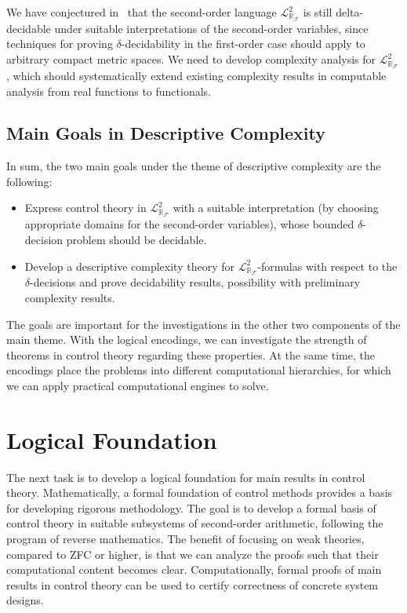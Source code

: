 \documentclass[10pt]{article}
\newcommand{\lrf}{\mathcal{L}_{\mathbb{R}_{\mathcal{F}}}}
\theoremstyle{definition}
\begin{document}
We have conjectured in~\cite{DBLP:conf/lics/GaoAC12} that the second-order language $\lrf^2$ is still delta-decidable under suitable interpretations of the second-order variables, since techniques for proving $\delta$-decidability in the first-order case should apply to arbitrary compact metric spaces. We need to develop complexity analysis for $\lrf^2$, which should systematically extend existing complexity results in computable analysis from real functions to functionals. 

\subsection{Main Goals in Descriptive Complexity} 
In sum, the two main goals under the theme of descriptive complexity are the following:
\begin{itemize}
\item Express control theory in $\mathcal{L}^2_{\mathbb{R}_{\mathcal{F}}}$ with a suitable interpretation (by choosing appropriate domains for the second-order variables), whose bounded $\delta$-decision problem should be decidable.
\item Develop a descriptive complexity theory for $\lrf^2$-formulas with respect to the $\delta$-decisions and prove decidability results, possibility with preliminary complexity results. 
\end{itemize}
The goals are important for the investigations in the other two components of the main theme. With the logical encodings, we can investigate the strength of theorems in control theory regarding these properties. At the same time, the encodings place the problems into different computational hierarchies, for which we can apply practical computational engines to solve. 

\section{Logical Foundation}\label{lf}

The next task is to develop a logical foundation for main results in control theory. Mathematically, a formal foundation of control methods provides a basis for developing rigorous methodology. The goal is to develop a formal basis of control theory in suitable subsystems of second-order arithmetic, following the program of reverse mathematics. The benefit of focusing on weak theories, compared to ZFC or higher, is that we can analyze the proofs such that their computational content becomes clear. Computationally, formal proofs of main results in control theory can be used to certify correctness of  concrete system designs. 
\end{document}
